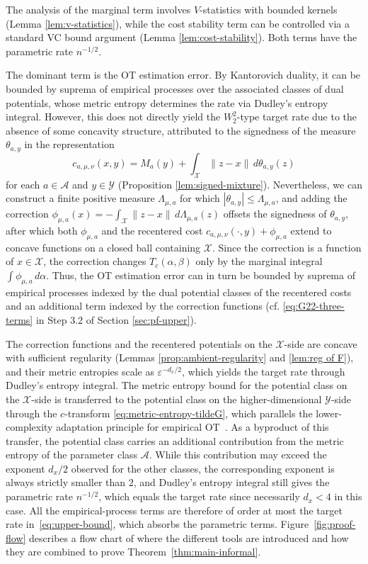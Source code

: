 \documentclass[11pt]{amsart}
\theoremstyle{definition}
\theoremstyle{remark}
\newcommand{\1}{\mathbf{1}}
\numberwithin{equation}{section}
\begin{document}
The analysis of the marginal term involves $V$-statistics with bounded kernels (Lemma \ref{lem:v-statistics}), while the
cost stability term can be controlled via a standard VC bound argument (Lemma \ref{lem:cost-stability}).
Both terms have the parametric rate $n^{-1/2}$.

The dominant term is the OT estimation error. By Kantorovich duality,
it can be bounded by suprema of empirical processes over the associated
classes of dual potentials, whose metric entropy determines the rate via Dudley's entropy integral. However, this does not directly yield the $W_2^2$-type target rate due to the absence of some concavity structure, attributed to the signedness of the measure $\theta_{a,y}$ in the representation
\[
c_{a,\mu,\nu}(x,y)
=
M_a(y)+\int_{\mathcal X}\|z-x\|\,d\theta_{a,y}(z)
\]
for each $a\in\mathcal A$ and $y\in\mathcal Y$ (Proposition \ref{lem:signed-mixture}). Nevertheless, we can construct a finite positive measure $\Lambda_{\mu,a}$ for which $|\theta_{a,y}| \leq \Lambda_{\mu,a}$, and adding the correction $\phi_{\mu,a}(x) = -\int_{\mathcal X}\|z-x\|\,d\Lambda_{\mu,a}(z)$ offsets the signedness of $\theta_{a, y}$, after which both $\phi_{\mu,a}$ and the recentered cost $c_{a,\mu,\nu}(\cdot,y) + \phi_{\mu,a}$ extend to concave functions on a closed ball containing $\mathcal X$. Since the correction is a function of $x\in \mathcal{X}$, the correction
changes $T_c(\alpha,\beta)$ only by the marginal integral
$\int\phi_{\mu,a}\,d\alpha$. Thus, the OT estimation error can in turn be bounded by
suprema of empirical processes indexed by the dual potential classes of the
recentered costs and an additional term indexed by the correction
functions (cf. \eqref{eq:G22-three-terms} in Step 3.2 of Section \ref{sec:pf-upper}).


The correction functions and the recentered potentials on the
$\mathcal X$-side are concave with sufficient regularity (Lemmas \ref{prop:ambient-regularity} and \ref{lem:reg of F}), and their metric
entropies scale as $\varepsilon^{-d_x/2}$, which yields the target rate through Dudley's entropy integral. The metric entropy bound for the potential class on the $\mathcal{X}$-side is transferred to the potential class on the higher-dimensional
$\mathcal Y$-side through the $c$-transform \eqref{eq:metric-entropy-tildeG}, which
parallels the lower-complexity adaptation principle for empirical
OT~\cite{groppe2024lower,hundrieser2024empirical}. As a byproduct of this transfer, the potential class carries an additional contribution from the metric entropy of
the parameter class $\mathcal A$. While this contribution may exceed the exponent $d_x/2$
observed for the other classes, the corresponding exponent is always
strictly smaller than $2$, and Dudley's entropy integral still gives the
parametric rate $n^{-1/2}$, which equals the target rate since necessarily
$d_x < 4$ in this case. All the empirical-process terms are therefore of
order at most the target rate in~\eqref{eq:upper-bound}, which absorbs the parametric terms. Figure~\ref{fig:proof-flow} describes a flow chart of where the different tools are introduced and how they are combined to prove Theorem~\ref{thm:main-informal}.
\end{document}

